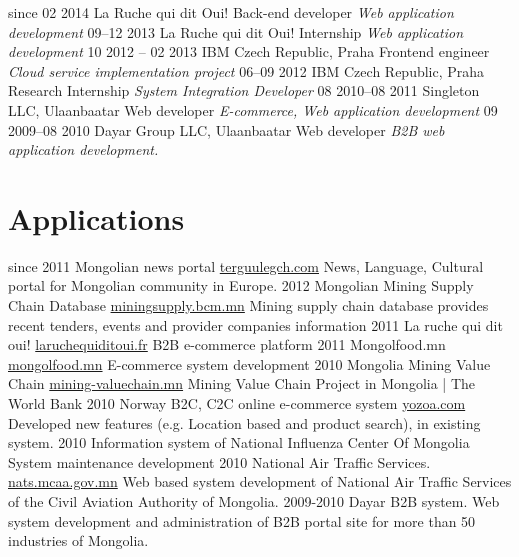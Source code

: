 \documentclass[]{friggeri-cv}
\begin{document}
\begin{entrylist}
  \entry
    {since 02 2014}
    {La Ruche qui dit Oui!}
    {Back-end developer}
    {\emph{Web application development}}
  \entry
    {09–12 2013}
    {La Ruche qui dit Oui!}
    {Internship}
    {\emph{Web application development}}
  \entry
    {10 2012 – 02 2013}
    {IBM Czech Republic, Praha}
    {Frontend engineer}
    {\emph{Cloud service implementation project}}
  \entry
    {06–09 2012}
    {IBM Czech Republic, Praha}
    {Research Internship}
    {\emph{System Integration Developer}}
  \entry
    {08 2010–08 2011}
    {Singleton LLC, Ulaanbaatar}
    {Web developer}
    {\emph{E-commerce, Web application development}}
  \entry
    {09 2009–08 2010}
    {Dayar Group LLC, Ulaanbaatar}
    {Web developer}
    {\emph{B2B web application development.}}
\end{entrylist}

\section{Applications}

\begin{entrylist}
  \entry
    {since 2011}
    {Mongolian news portal}
    {\href{http://terguulegch.com}{terguulegch.com}}
    {News, Language, Cultural portal for Mongolian community in Europe.}
  \entry
    {2012}
    {Mongolian Mining Supply Chain Database}
    {\href{http://miningsupply.bcm.mn}{miningsupply.bcm.mn}}
    {Mining supply chain database provides recent tenders, events and provider companies information }
  \entry
    {2011}
    {La ruche qui dit oui!}
    {\href{http://www.laruchequiditoui.fr}{laruchequiditoui.fr}}
    {B2B e-commerce platform}
  \entry
    {2011}
    {Mongolfood.mn}
    {\href{http://mongolfood.mn/}{mongolfood.mn}}
    {E-commerce system development}
  \entry
    {2010}
    {Mongolia Mining Value Chain}
    {\href{http://mining-valuechain.eri.mn}{mining-valuechain.mn}}
    {Mining Value Chain Project in Mongolia | The World Bank}
  \entry
    {2010}
    {Norway B2C, C2C online e-commerce system}
    {\href{http://dev.yozoa.com}{yozoa.com}}
    {Developed new features (e.g. Location based and product search),  in existing system.}
  \entry
    {2010}
    {Information system of National Influenza Center Of Mongolia}
    {}
    {System maintenance development}
  \entry
    {2010}
    {National Air Traffic Services.}
    {\href{http://nats.mcaa.gov.mn/}{nats.mcaa.gov.mn}}
    {Web based system development of National Air Traffic Services of the Civil Aviation Authority of Mongolia.}
  \entry
    {2009-2010}
    {Dayar B2B system.}
    {}
    {Web system development and administration of B2B portal site for more than 50 industries of Mongolia.}
\end{entrylist}
\end{document}
